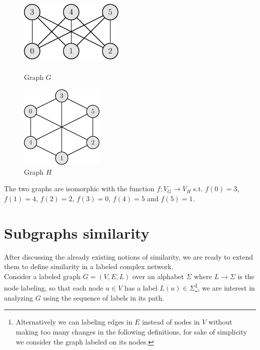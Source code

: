 \begin{esempio}
	\begin{figure}[h]
		\centering
		\begin{minipage}[t]{.45\textwidth}
			\centering
			\includegraphics[width=5cm,height=3.33cm]{figure/figure-2-3}
			\caption{Graph $G$}
		\end{minipage}\hfill
		\begin{minipage}[t]{.45\textwidth}
			\centering
			\includegraphics[width=4cm,height=4cm]{figure/figure-2-4}
			\caption{Graph $H$}
		\end{minipage}
	\end{figure}

	The two graphs are isomorphic with the function $f : V_{G} \rightarrow V_{H}$ s.t. $f(0) = 3$, $f(1) = 4$, $f(2) = 2$, $f(3) = 0$, $f(4) = 5$ and $f(5) = 1$. 
	
\end{esempio}


\section{Subgraphs similarity}

After discussing the already existing notions of similarity, we are ready to extend them to define similarity in a labeled complex network.\\

Consider a labeled graph $G = (V, E, L)$ over an alphabet $\Sigma$ where $L \rightarrow \Sigma$ is the node labeling, so that each node $u \in V$ has a label $L(u) \in \Sigma$\footnote{Alternatively we can labeling edges in $E$ instead of nodes in $V$ without making too many changes in the following definitions, for sake of simplicity we consider the graph labeled on its nodes.}, we are interest in analyzing $G$ using the sequence of labels in its path.\\


